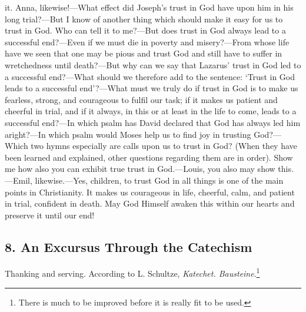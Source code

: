 it. Anna, likewise!—What effect did Joseph’s trust in God have upon him in his long trial?—But I know of another thing which should make it easy for us to trust in God. Who can tell it to me?—But does trust in God always lead to a successful end?—Even if we must die in poverty and misery?—From whose life have we seen that one may be pious and trust God and still have to suffer in wretchedness until death?—But why can we say that Lazarus’ trust in God led to a successful end?—What should we therefore add to the sentence: ‘Trust in God leads to a successful end’?—What must we truly do if trust in God is to make us fearless, strong, and courageous to fulfil our task; if it makes us patient and cheerful in trial, and if it always, in this or at least in the life to come, leads to a successful end?—In which psalm has David declared that God has always led him aright?—In which psalm would Moses help us to find joy in trusting God?—Which two hymns especially are calls upon us to trust in God? (When they have been learned and explained, other questions regarding them are in order). Show me how also you can exhibit true trust in God.—Louis, you also may show this.—Emil, likewise.—Yes, children, to trust God in all things is one of the main points in Christianity. It makes us courageous in life, cheerful, calm, and patient in trial, confident in death. May God Himself awaken this within our hearts and preserve it until our end!

\subsection{8. An Excursus Through the Catechism}

Thanking and serving. According to L. Schultze, \emph{Katechet. Bausteine}.\footnote{There is much to be improved before it is really fit to be used.}

